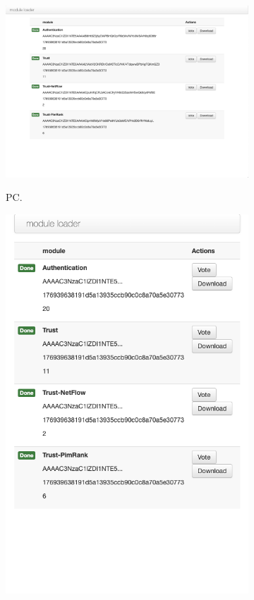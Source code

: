 \begin{figure}[h!]
	\centering
	\begin{subfigure}[t]{.69\textwidth}
		\centering
		\captionsetup{width=.9\linewidth}
		{\includegraphics[width=0.95\linewidth]{images/gui-pc.png}}
		\caption{PC.}
		\label{fig:shared-library}
	\end{subfigure}\hfill%
	\begin{subfigure}[t]{.31\textwidth}
		\centering
		\captionsetup{width=.9\linewidth}
		\includegraphics[width=0.95\linewidth]{images/gui-mobile.png}

\end{subfigure}
\end{figure}

